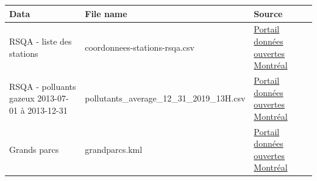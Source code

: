 \documentclass[]{book}
\theoremstyle{definition}
\theoremstyle{definition}
\theoremstyle{definition}
\theoremstyle{remark}
\begin{document}
\begin{longtable}[]{@{}lll@{}}
\toprule
\begin{minipage}[b]{0.08\columnwidth}\raggedright\strut
Data\strut
\end{minipage} & \begin{minipage}[b]{0.15\columnwidth}\raggedright\strut
File name\strut
\end{minipage} & \begin{minipage}[b]{0.10\columnwidth}\raggedright\strut
Source\strut
\end{minipage}\tabularnewline
\midrule
\endhead
\begin{minipage}[t]{0.08\columnwidth}\raggedright\strut
RSQA - liste des stations\strut
\end{minipage} & \begin{minipage}[t]{0.15\columnwidth}\raggedright\strut
coordonnees-stations-rsqa.csv\strut
\end{minipage} & \begin{minipage}[t]{0.10\columnwidth}\raggedright\strut
\href{http://donnees.ville.montreal.qc.ca/dataset/rsqa-liste-des-stations/resource/29db5545-89a4-4e4a-9e95-05aa6dc2fd80}{Portail
données ouvertes Montréal}\strut
\end{minipage}\tabularnewline
\begin{minipage}[t]{0.08\columnwidth}\raggedright\strut
RSQA - polluants gazeux 2013-07-01 à 2013-12-31\strut
\end{minipage} & \begin{minipage}[t]{0.15\columnwidth}\raggedright\strut
pollutants\_average\_12\_31\_2019\_13H.csv\strut
\end{minipage} & \begin{minipage}[t]{0.10\columnwidth}\raggedright\strut
\href{http://donnees.ville.montreal.qc.ca/dataset/rsqa-polluants-gazeux/resource/26ddbd0b-47f6-4039-98b2-b32568ed01b1}{Portail
données ouvertes Montréal}\strut
\end{minipage}\tabularnewline
\begin{minipage}[t]{0.08\columnwidth}\raggedright\strut
Grands parcs\strut
\end{minipage} & \begin{minipage}[t]{0.15\columnwidth}\raggedright\strut
grandparcs.kml\strut
\end{minipage} & \begin{minipage}[t]{0.10\columnwidth}\raggedright\strut
\href{http://donnees.ville.montreal.qc.ca/dataset/grands-parcs}{Portail
données ouvertes Montréal}\strut
\end{minipage}\tabularnewline

\end{longtable}
\end{document}
